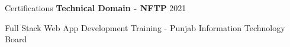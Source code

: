 \documentclass{resume} %
\begin{document}
\begin{rSection}{Certifications} 
	\textbf{Technical Domain - NFTP} \hfill 2021 
    \item {Full Stack Web App Development Training - Punjab Information Technology
    Board}



\end{rSection}

\end{document}
